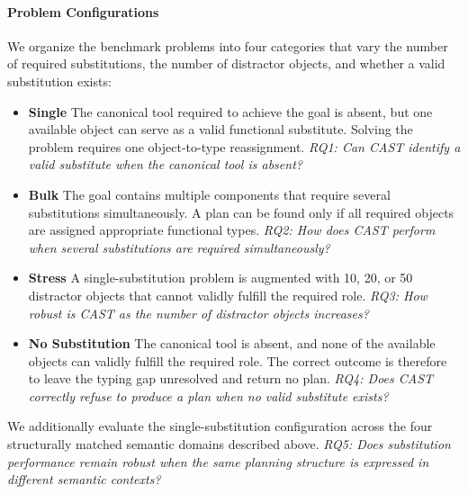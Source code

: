 \paragraph{Problem Configurations}
We organize the benchmark problems into four categories that vary the number of required substitutions, the number of distractor objects, and whether a valid substitution exists:

\begin{itemize}\item \textbf{Single} The canonical tool required to achieve the goal is absent, but one available object can serve as a valid functional substitute. Solving the problem requires one object-to-type reassignment. \textit{RQ1: Can CAST identify a valid substitute when the canonical tool is absent?}

\item \textbf{Bulk} The goal contains multiple components that require several substitutions simultaneously. A plan can be found only if all required objects are assigned appropriate functional types. \textit{RQ2: How does CAST perform when several substitutions are required simultaneously?}

\item \textbf{Stress} A single-substitution problem is augmented with 10, 20, or 50 distractor objects that cannot validly fulfill the required role. \textit{RQ3: How robust is CAST as the number of distractor objects increases?}

\item \textbf{No Substitution} The canonical tool is absent, and none of the available objects can validly fulfill the required role. The correct outcome is therefore to leave the typing gap unresolved and return no plan. \textit{RQ4: Does CAST correctly refuse to produce a plan when no valid substitute exists?}
\end{itemize}

We additionally evaluate the single-substitution configuration across the four structurally matched semantic domains described above. \textit{RQ5: Does substitution performance remain robust when the same planning structure is expressed in different semantic contexts?}




